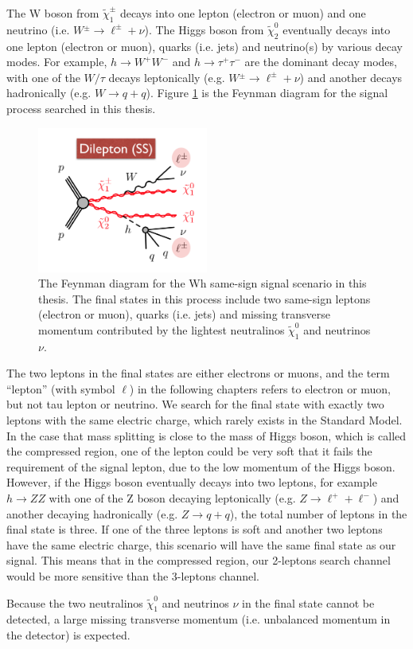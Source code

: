 The W boson from $\tilde{\chi}_1^\pm$ decays into one lepton (electron or muon) and one neutrino (i.e. $W{^\pm} \rightarrow \ell^{\pm} + \nu$).
The Higgs boson from $\tilde{\chi}_2^0$ eventually decays into one lepton (electron or muon), quarks (i.e. jets) and neutrino(s) by various decay modes.
For example, $h \rightarrow W^{+} W^{-} $ and $h \rightarrow \tau^{+} \tau^{-} $ are the dominant decay modes, with one of the $W / \tau$ decays leptonically (e.g. $W{^\pm} \rightarrow \ell^{\pm} + \nu$) and another decays hadronically (e.g. $W \rightarrow q + q$).
Figure \ref{fig:signal_feynman} is the Feynman diagram for the signal process searched in this thesis.

\begin{figure}
\centering
\includegraphics[width=0.5\textwidth]{data/photo/theory/signal_feynman.png}
\caption{The Feynman diagram for the Wh same-sign signal scenario in this thesis. The final states in this process include two same-sign leptons (electron or muon), quarks (i.e. jets) and missing transverse momentum contributed by the lightest neutralinos $\tilde{\chi}_1^0$ and neutrinos $\nu$.}
\label{fig:signal_feynman}
\end{figure}

The two leptons in the final states are either electrons or muons, and the term ``lepton'' (with symbol $\ell$) in the following chapters refers to electron or muon, but not tau lepton or neutrino.
We search for the final state with exactly two leptons with the same electric charge, which rarely exists in the Standard Model.
In the case that mass splitting is close to the mass of Higgs boson, which is called the compressed region, one of the lepton could be very soft that it fails the requirement of the signal lepton, due to the low momentum of the Higgs boson.
However, if the Higgs boson eventually decays into two leptons, for example $h \rightarrow ZZ$ with one of the Z boson decaying leptonically (e.g. $Z \rightarrow \ell^{+} + \ell^{-}$) and another decaying hadronically (e.g. $Z \rightarrow q + q$), the total number of leptons in the final state is three.
If one of the three leptons is soft and another two leptons have the same electric charge, this scenario will have the same final state as our signal.
This means that in the compressed region, our 2-leptons search channel would be more sensitive than the 3-leptons channel.

Because the two neutralinos $\tilde{\chi}_1^0$ and neutrinos $\nu$ in the final state cannot be detected, a large missing transverse momentum (i.e. unbalanced momentum in the detector) is expected.
